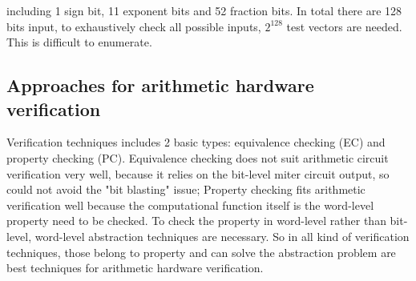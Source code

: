 \documentclass[11pt,twoside, onecolumn]{IEEEtran}
\begin{document}
including 1 sign bit, 11 exponent bits and 52 fraction bits. In total there are 128 bits input,
to exhaustively check all possible inputs, $2^{128}$ test vectors are needed. This is difficult 
to enumerate.

\subsection{Approaches for arithmetic hardware verification}
Verification techniques includes 2 basic types: equivalence checking (EC) and property checking
(PC). Equivalence checking does not suit arithmetic circuit verification very well, because it 
relies on the bit-level miter circuit output, so could not avoid the "bit blasting" issue;
Property checking fits arithmetic verification well because the computational function itself is 
the word-level property need to be checked. To check the property in word-level rather than
bit-level, word-level abstraction techniques are necessary. So in all kind of verification
techniques, those belong to property and can solve the abstraction problem are best techniques
for arithmetic hardware verification.
\end{document}
